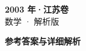 \documentclass[zihao=-4, a4paper]{ctexart}
\begin{document}
\begin{center}
  {\Large\bfseries 2003 年·江苏卷}\\[4pt]
  {\large 数学 · 解析版}
\end{center}
\medskip
{}

\clearpage
{}
\begin{center}{\Large\bfseries 参考答案与详细解析}\end{center}
\medskip

\end{document}
